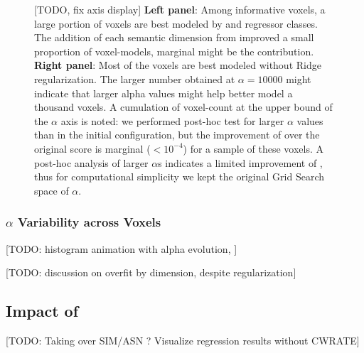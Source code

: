 \begin{figure}
    \centering
    \caption[Best Hyper-parameter Configuration Voxel-Count Histograms]{[TODO, fix axis display] \textbf{Left panel}: Among informative voxels, a large portion of voxels are best modeled by  and  regressor classes. The addition of each semantic dimension from  improved a small proportion of voxel-models, marginal might be the contribution. \textbf{Right panel}: Most of the voxels are best modeled without Ridge regularization. The larger number obtained at \(\alpha=10000\) might indicate that larger alpha values might help better model a thousand voxels. A cumulation of voxel-count at the upper bound of the \(\alpha\) axis is noted: we performed post-hoc test for larger \(\alpha\) values than in the initial configuration, but the improvement of  over the original score is marginal (\(<10^{-4}\)) for a sample of these voxels. A post-hoc analysis of larger \(\alpha\)s indicates a limited improvement of , thus for computational simplicity we kept the original Grid Search space of \(\alpha\).\label{fig:MIX_CountPlotAlphaDimS1R0}} 
    
\end{figure}

\subsubsection{\(\alpha\) Variability across Voxels}
[TODO: histogram animation with alpha evolution, ]

[TODO: discussion on overfit by dimension, despite regularization]




\subsection{Impact of }
[TODO: Taking over SIM/ASN ? Visualize regression results without CWRATE]

